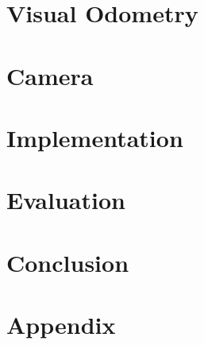 \documentclass[oneside,12pt,bibtotoc]{scrreprt}
\begin{document}
\chapter{Visual Odometry}
    
    
\chapter{Camera}
    

\chapter{Implementation}
     
        
\chapter{Evaluation}    
      

\chapter{Conclusion}
    
    
        
\printbibliography[title={References}]

\appendix
\chapter{Appendix}

\end{document}
